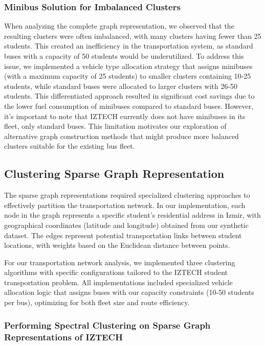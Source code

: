\subsubsection{Minibus Solution for Imbalanced Clusters}
\label{subsubsec:minibus_solution}

When analyzing the complete graph representation, we observed that the resulting clusters were often imbalanced, with many clusters having fewer than 25 students. This created an inefficiency in the transportation system, as standard buses with a capacity of 50 students would be underutilized. To address this issue, we implemented a vehicle type allocation strategy that assigns minibuses (with a maximum capacity of 25 students) to smaller clusters containing 10-25 students, while standard buses were allocated to larger clusters with 26-50 students. This differentiated approach resulted in significant cost savings due to the lower fuel consumption of minibuses compared to standard buses. However, it's important to note that IZTECH currently does not have minibuses in its fleet, only standard buses. This limitation motivates our exploration of alternative graph construction methods that might produce more balanced clusters suitable for the existing bus fleet.

\subsection{Clustering Sparse Graph Representation}
\label{subsec:clustering_sparse}

The sparse graph representations required specialized clustering approaches to effectively partition the transportation network. In our implementation, each node in the graph represents a specific student's residential address in Izmir, with geographical coordinates (latitude and longitude) obtained from our synthetic dataset. The edges represent potential transportation links between student locations, with weights based on the Euclidean distance between points.

For our transportation network analysis, we implemented three clustering algorithms with specific configurations tailored to the IZTECH student transportation problem. All implementations included specialized vehicle allocation logic that assigns buses with our capacity constraints (10-50 students per bus), optimizing for both fleet size and route efficiency.

\subsubsection{Performing Spectral Clustering on Sparse Graph Representations of IZTECH}
\label{subsubsec:spectral_implementation}

